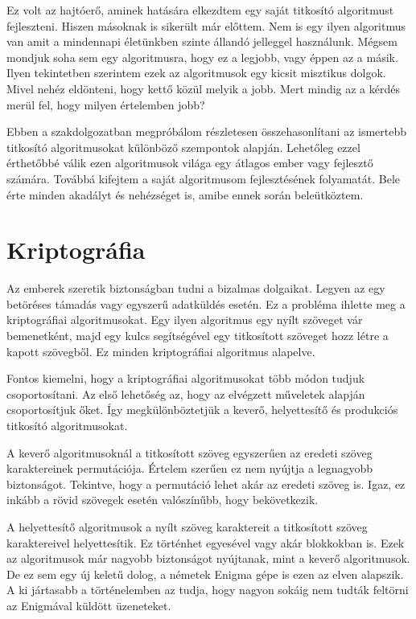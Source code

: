 \documentclass[12pt]{report} %
\begin{document}
Ez volt az hajtóerő, aminek hatására elkezdtem egy saját titkosító algoritmust fejleszteni. Hiszen másoknak is sikerült már előttem. Nem is egy ilyen algoritmus van amit a mindennapi életünkben szinte állandó jelleggel használunk. Mégsem mondjuk soha sem egy algoritmusra, hogy ez a legjobb, vagy éppen az a másik. Ilyen tekintetben szerintem ezek az algoritmusok egy kicsit misztikus dolgok. Mivel nehéz eldönteni, hogy kettő közül melyik a jobb. Mert mindig az a kérdés merül fel, hogy milyen értelemben jobb?

Ebben a szakdolgozatban megpróbálom részletesen összehasonlítani az ismertebb titkosító algoritmusokat különböző szempontok alapján. Lehetőleg ezzel érthetőbbé válik ezen algoritmusok világa egy átlagos ember vagy fejlesztő számára. Továbbá kifejtem a saját algoritmusom fejlesztésének folyamatát. Bele érte minden akadályt és nehézséget is, amibe ennek során beleütköztem.

\section{Kriptográfia} %

Az emberek szeretik biztonságban tudni a bizalmas dolgaikat. Legyen az egy betöréses támadás vagy egyszerű adatküldés esetén. Ez a probléma ihlette meg a kriptográfiai algoritmusokat. Egy ilyen algoritmus egy nyílt szöveget vár bemenetként, majd egy kulcs segítségével egy titkosított szöveget hozz létre a kapott szövegből. Ez minden kriptográfiai algoritmus alapelve.

Fontos kiemelni, hogy a kriptográfiai algoritmusokat \cite{szteCryptography} több módon tudjuk csoportosítani. Az első lehetőség az, hogy az elvégzett műveletek alapján csoportosítjuk őket. Így megkülönböztetjük a keverő, helyettesítő és produkciós titkosító algoritmusokat.

A keverő algoritmusoknál a titkosított szöveg egyszerűen az eredeti szöveg karaktereinek permutációja. Értelem szerűen ez nem nyújtja a legnagyobb biztonságot. Tekintve, hogy a permutáció lehet akár az eredeti szöveg is. Igaz, ez inkább a rövid szövegek esetén valószínűbb, hogy bekövetkezik.

A helyettesítő algoritmusok a nyílt szöveg karaktereit a titkosított szöveg karaktereivel helyettesítik. Ez történhet egyesével vagy akár blokkokban is. Ezek az algoritmusok már nagyobb biztonságot nyújtanak, mint a keverő algoritmusok. De ez sem egy új keletű dolog, a németek Enigma gépe is ezen az elven alapszik. A ki jártasabb a történelemben az tudja, hogy nagyon sokáig nem tudták feltörni az Enigmával küldött üzeneteket.
\end{document}
